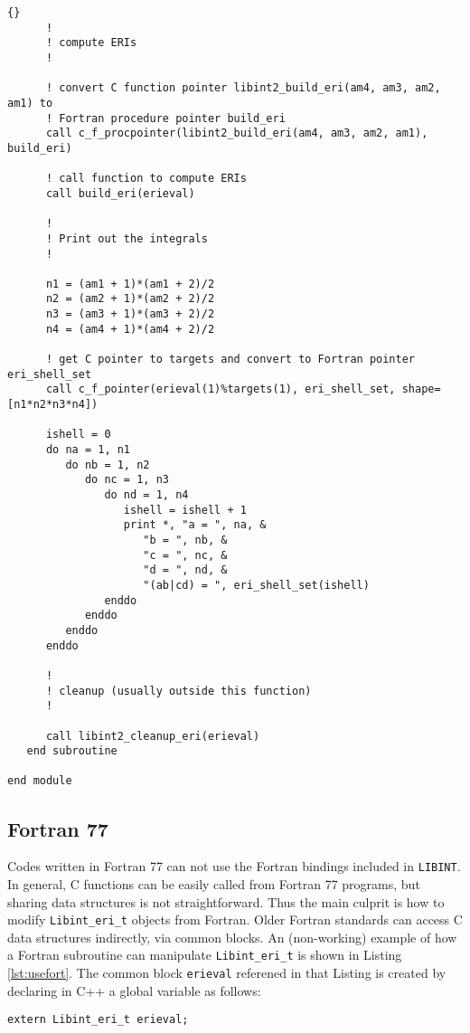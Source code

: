 \documentclass[10pt]{article}
\begin{document}
\begin{lstlisting}[label=lst:usefortran, caption=Using \LIBINT\ from Fortran.]{}
      !
      ! compute ERIs
      !

      ! convert C function pointer libint2_build_eri(am4, am3, am2, am1) to
      ! Fortran procedure pointer build_eri
      call c_f_procpointer(libint2_build_eri(am4, am3, am2, am1), build_eri)

      ! call function to compute ERIs
      call build_eri(erieval)

      !
      ! Print out the integrals
      !

      n1 = (am1 + 1)*(am1 + 2)/2
      n2 = (am2 + 1)*(am2 + 2)/2
      n3 = (am3 + 1)*(am3 + 2)/2
      n4 = (am4 + 1)*(am4 + 2)/2

      ! get C pointer to targets and convert to Fortran pointer eri_shell_set
      call c_f_pointer(erieval(1)%targets(1), eri_shell_set, shape=[n1*n2*n3*n4])

      ishell = 0
      do na = 1, n1
         do nb = 1, n2
            do nc = 1, n3
               do nd = 1, n4
                  ishell = ishell + 1
                  print *, "a = ", na, &
                     "b = ", nb, &
                     "c = ", nc, &
                     "d = ", nd, &
                     "(ab|cd) = ", eri_shell_set(ishell)
               enddo
            enddo
         enddo
      enddo

      !
      ! cleanup (usually outside this function)
      !

      call libint2_cleanup_eri(erieval)
   end subroutine

end module
\end{lstlisting}

\subsection{Fortran 77}
Codes written in Fortran 77 can not use the Fortran bindings included in {\tt LIBINT}.
In general, C functions can be easily called from Fortran 77 programs, but sharing data structures
is not straightforward. Thus the main culprit is how to modify  {\tt Libint\_eri\_t} objects
from Fortran. Older Fortran standards can access C data structures indirectly, via
common blocks. An (non-working) example of how a Fortran subroutine can manipulate {\tt Libint\_eri\_t}
is shown in Listing \ref{lst:usefort}. The
common block {\tt erieval} referened in that Listing is created by declaring
in C++ a global variable as follows:
\begin{verbatim}
extern Libint_eri_t erieval;
\end{verbatim}
\end{document}
